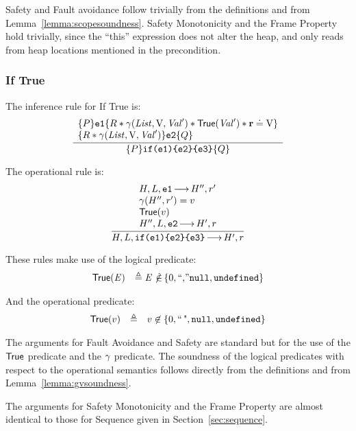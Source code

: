 \documentclass{article}
\begin{document}
Safety and Fault avoidance follow trivially from the definitions and from Lemma~\ref{lemma:scopesoundness}. Safety Monotonicity and the Frame Property hold trivially, since the ``this'' expression does not alter the heap, and only reads from heap locations mentioned in the precondition.

\subsubsection{If True}
\label{sec:iftrue}

The inference rule for If True is:
\[\frac
{\begin{array}{l}
        \{P\}\mbox{\texttt{{\upshape e1}}}\{R \mathbin{*} \gamma({\mathit{List}},{{{\mathrm{V}}}},{\mathit{Val}}')\mathbin{*} \mathsf{True}({\mathit{Val}}')\mathbin{*}{\mathrm{\textbf{r}}}\doteq{{{\ensuremath{\mathrm{V}}}}}\} \\
    \{R  \mathbin{*} \gamma({\mathit{List}},{{{\mathrm{V}}}},{\mathit{Val}}')\}\mbox{\texttt{{\upshape e2}}}\{Q\}
    \end{array}}
{\{P\}\mbox{\texttt{{\upshape if(e1)\{e2\}\{e3\}}}}\{Q\}}
\]

The operational rule is:
\[\frac
{  \begin{array}{l}
 H,L,\mbox{\texttt{{\upshape e1}}} {\,\longrightarrow\,} H'',r' \\
 \gamma(H'',r')=v\\
 \mathsf{True}(v)
  \\ H'',L,\mbox{\texttt{{\upshape e2}}} {\,\longrightarrow\,} H',r
  \end{array}
}
{H,L,\mbox{\texttt{{\upshape if(e1)\{e2\}\{e3\}}}} {\,\longrightarrow\,} H',r }
\]

These rules make use of the logical predicate:
\[
\begin{array}{ll}
        \mathsf{True}({\mathit{E}}) &\triangleq {\ensuremath{\mathit{E}}}\not\!\!\mbox{$\,\dot{\in}\,$}\{0,\text{``,''}\mbox{\texttt{{\upshape null}}},\mbox{\texttt{{\upshape undefined}}}\}\\
\end{array}
\]

And the operational predicate:
\[\begin{array}{rll}
        \mathsf{True}(v)&\triangleq& v\not\in\{0,\text{``\,"},\mbox{\texttt{{\upshape null}}},\mbox{\texttt{{\upshape undefined}}}\}\\
\end{array}\]

The arguments for Fault Avoidance and Safety are standard but for the use of the $\mathsf{True}$ predicate and the $\gamma$ predicate. The soundness of the logical predicates with respect to the operational semantics follows directly from the definitions and from Lemma~\ref{lemma:gvsoundness}.

The arguments for Safety Monotonicity and the Frame Property are almost identical to those for Sequence given in Section~\ref{sec:sequence}.
\end{document}
